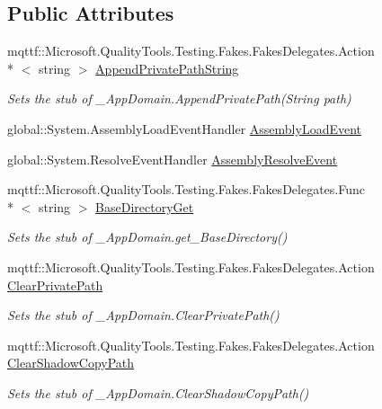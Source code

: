 \subsection*{Public Attributes}
\begin{DoxyCompactItemize}
\item 
mqttf\-::\-Microsoft.\-Quality\-Tools.\-Testing.\-Fakes.\-Fakes\-Delegates.\-Action\\*
$<$ string $>$ \hyperlink{class_system_1_1_fakes_1_1_stub___app_domain_aa451a77ab12bc747d43d8200537b047f}{Append\-Private\-Path\-String}
\begin{DoxyCompactList}\small\item\em Sets the stub of \-\_\-\-App\-Domain.\-Append\-Private\-Path(\-String path)\end{DoxyCompactList}\item 
global\-::\-System.\-Assembly\-Load\-Event\-Handler \hyperlink{class_system_1_1_fakes_1_1_stub___app_domain_a494b8812819afdf2415fbf3a601d9b17}{Assembly\-Load\-Event}
\item 
global\-::\-System.\-Resolve\-Event\-Handler \hyperlink{class_system_1_1_fakes_1_1_stub___app_domain_a6bb05b68ba75d97e1c3188ede5af4e98}{Assembly\-Resolve\-Event}
\item 
mqttf\-::\-Microsoft.\-Quality\-Tools.\-Testing.\-Fakes.\-Fakes\-Delegates.\-Func\\*
$<$ string $>$ \hyperlink{class_system_1_1_fakes_1_1_stub___app_domain_a4417b47dd13981f19e2dfaabcccc09eb}{Base\-Directory\-Get}
\begin{DoxyCompactList}\small\item\em Sets the stub of \-\_\-\-App\-Domain.\-get\-\_\-\-Base\-Directory()\end{DoxyCompactList}\item 
mqttf\-::\-Microsoft.\-Quality\-Tools.\-Testing.\-Fakes.\-Fakes\-Delegates.\-Action \hyperlink{class_system_1_1_fakes_1_1_stub___app_domain_aadb1651c5cda96054ba9fd15fbfda137}{Clear\-Private\-Path}
\begin{DoxyCompactList}\small\item\em Sets the stub of \-\_\-\-App\-Domain.\-Clear\-Private\-Path()\end{DoxyCompactList}\item 
mqttf\-::\-Microsoft.\-Quality\-Tools.\-Testing.\-Fakes.\-Fakes\-Delegates.\-Action \hyperlink{class_system_1_1_fakes_1_1_stub___app_domain_a13749bd2690dbb028bd195c1e177c0a4}{Clear\-Shadow\-Copy\-Path}
\begin{DoxyCompactList}\small\item\em Sets the stub of \-\_\-\-App\-Domain.\-Clear\-Shadow\-Copy\-Path()\end{DoxyCompactList}\item 

\end{DoxyCompactItemize}
